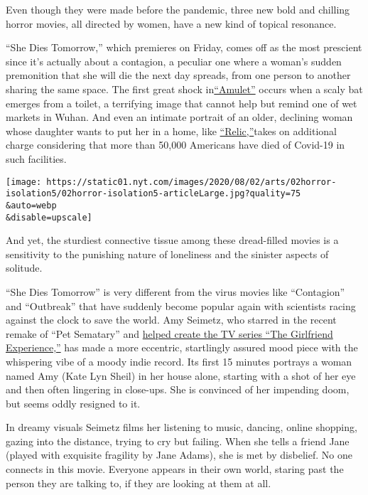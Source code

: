 Even though they were made before the pandemic, three new bold and
chilling horror movies, all directed by women, have a new kind of
topical resonance.

``She Dies Tomorrow,'' which premieres on Friday, comes off as the most
prescient since it's actually about a contagion, a peculiar one where a
woman's sudden premonition that she will die the next day spreads, from
one person to another sharing the same space. The first great shock
in\href{https://www.nytimes.com/2020/07/22/movies/amulet-review.html}{``Amulet''}
occurs when a scaly bat emerges from a toilet, a terrifying image that
cannot help but remind one of wet markets in Wuhan. And even an intimate
portrait of an older, declining woman whose daughter wants to put her in
a home, like
\href{https://www.nytimes.com/2020/07/09/movies/relic-review-a-haunted-house-and-a-clouded-mind.html}{``Relic,''}takes
on additional charge considering that more than 50,000 Americans have
died of Covid-19 in such facilities.

\texttt{[image: https://static01.nyt.com/images/2020/08/02/arts/02horror-isolation5/02horror-isolation5-articleLarge.jpg?quality=75\\\&auto=webp\\\&disable=upscale]}

And yet, the sturdiest connective tissue among these dread-filled movies
is a sensitivity to the punishing nature of loneliness and the sinister
aspects of solitude.

``She Dies Tomorrow'' is very different from the virus movies like
``Contagion'' and ``Outbreak'' that have suddenly become popular again
with scientists racing against the clock to save the world. Amy Seimetz,
who starred in the recent remake of ``Pet Sematary'' and
\href{https://www.nytimes.com/2016/04/03/arts/television/starz-the-girlfriend-experience.html}{helped
create the TV series ``The Girlfriend Experience,''} has made a more
eccentric, startlingly assured mood piece with the whispering vibe of a
moody indie record. Its first 15 minutes portrays a woman named Amy
(Kate Lyn Sheil) in her house alone, starting with a shot of her eye and
then often lingering in close-ups. She is convinced of her impending
doom, but seems oddly resigned to it.

In dreamy visuals Seimetz films her listening to music, dancing, online
shopping, gazing into the distance, trying to cry but failing. When she
tells a friend Jane (played with exquisite fragility by Jane Adams), she
is met by disbelief. No one connects in this movie. Everyone appears in
their own world, staring past the person they are talking to, if they
are looking at them at all.

